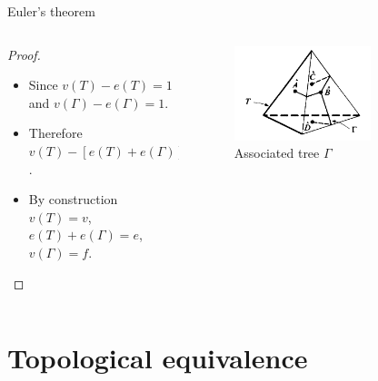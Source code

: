\documentclass{beamer}
\begin{document}
\begin{frame}{Euler's theorem}
  \begin{columns}
    \begin{column}{0.6\textwidth}
      \begin{proof}
        \begin{itemize}
        \item Since $v(T) - e(T) = 1$ and $v(\Gamma) - e(\Gamma) = 1$.
        \item Therefore $v(T) - [e(T) + e(\Gamma)] + v(\Gamma) = 2$.
        \item By construction $v(T) = v$, $e(T) + e(\Gamma) = e$, $v(\Gamma) = f$.
        \end{itemize}
      \end{proof}
    \end{column}
    \begin{column}{0.4\textwidth}
      \begin{figure}
        \centering
        \includegraphics[width=0.7\textwidth]{figure_1_5_c.png}
        \caption{Associated tree $\Gamma$}
      \end{figure}
    \end{column}
  \end{columns}
\end{frame}

\section{Topological equivalence}
\end{document}
